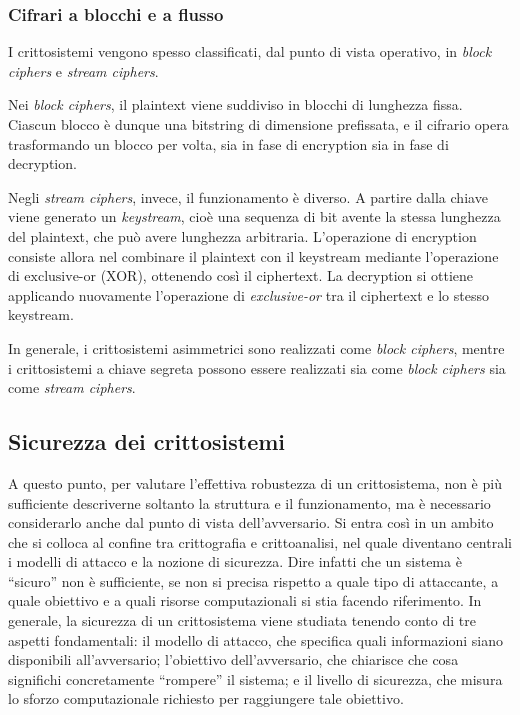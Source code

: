 \subsubsection{Cifrari a blocchi e a flusso}

I crittosistemi vengono spesso classificati, dal punto di vista operativo, in \emph{block ciphers} e \emph{stream
ciphers}.

Nei \emph{block ciphers}, il plaintext viene suddiviso in blocchi di lunghezza fissa. Ciascun blocco è dunque una
bitstring di dimensione prefissata, e il cifrario opera trasformando un blocco per volta, sia in fase di encryption sia
in fase di decryption.

Negli \emph{stream ciphers}, invece, il funzionamento è diverso. A partire dalla chiave viene generato un
\emph{keystream}, cioè una sequenza di bit avente la stessa lunghezza del plaintext, che può avere lunghezza
arbitraria. L'operazione di encryption consiste allora nel combinare il plaintext con il keystream mediante
l'operazione di $\mbox{exclusive-or}$ (XOR), ottenendo così il ciphertext. La decryption si ottiene applicando
nuovamente l'operazione di \emph{exclusive-or} tra il ciphertext e lo stesso keystream.

In generale, i crittosistemi asimmetrici sono realizzati come \emph{block ciphers}, mentre i crittosistemi a chiave
segreta possono essere realizzati sia come \emph{block ciphers} sia come \emph{stream ciphers}.

\newpage

\subsection{Sicurezza dei crittosistemi}

A questo punto, per valutare l'effettiva robustezza di un crittosistema, non è più sufficiente descriverne soltanto la
struttura e il funzionamento, ma è necessario considerarlo anche dal punto di vista dell'avversario. Si entra così in
un ambito che si colloca al confine tra crittografia e crittoanalisi, nel quale diventano centrali i modelli di attacco
e la nozione di sicurezza. Dire infatti che un sistema è ``sicuro'' non è sufficiente, se non si precisa rispetto a
quale tipo di attaccante, a quale obiettivo e a quali risorse computazionali si stia facendo riferimento. In generale,
la sicurezza di un crittosistema viene studiata tenendo conto di tre aspetti fondamentali: il modello di attacco, che
specifica quali informazioni siano disponibili all'avversario; l'obiettivo dell'avversario, che chiarisce che cosa
significhi concretamente ``rompere'' il sistema; e il livello di sicurezza, che misura lo sforzo computazionale
richiesto per raggiungere tale obiettivo.

